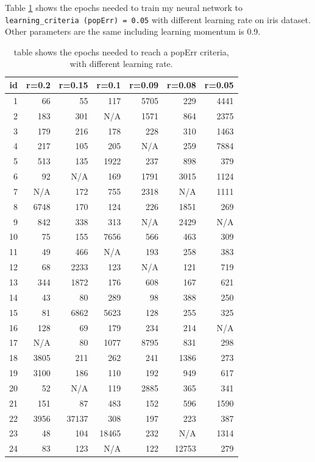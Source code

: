\documentclass[11pt]{article}
\begin{document}
Table \ref{table-epochs-needed} shows the epochs needed to train my neural network to \texttt{learning\_criteria (popErr) = 0.05} with different learning rate on iris dataset. Other parameters are the same including learning momentum is 0.9.

\begin{table}[htb]
\caption{table shows the epochs needed to reach a popErr criteria, with different learning rate.  \label{table-epochs-needed}}
\centering
\begin{tabular}{rrrrrrr}
id & r=0.2 & r=0.15 & r=0.1 & r=0.09 & r=0.08 & r=0.05\\
\hline
1 & 66 & 55 & 117 & 5705 & 229 & 4441\\
2 & 183 & 301 & N/A & 1571 & 864 & 2375\\
3 & 179 & 216 & 178 & 228 & 310 & 1463\\
4 & 217 & 105 & 205 & N/A & 259 & 7884\\
5 & 513 & 135 & 1922 & 237 & 898 & 379\\
6 & 92 & N/A & 169 & 1791 & 3015 & 1124\\
7 & N/A & 172 & 755 & 2318 & N/A & 1111\\
8 & 6748 & 170 & 124 & 226 & 1851 & 269\\
9 & 842 & 338 & 313 & N/A & 2429 & N/A\\
10 & 75 & 155 & 7656 & 566 & 463 & 309\\
11 & 49 & 466 & N/A & 193 & 258 & 383\\
12 & 68 & 2233 & 123 & N/A & 121 & 719\\
13 & 344 & 1872 & 176 & 608 & 167 & 621\\
14 & 43 & 80 & 289 & 98 & 388 & 250\\
15 & 81 & 6862 & 5623 & 128 & 255 & 325\\
16 & 128 & 69 & 179 & 234 & 214 & N/A\\
17 & N/A & 80 & 1077 & 8795 & 831 & 298\\
18 & 3805 & 211 & 262 & 241 & 1386 & 273\\
19 & 3100 & 186 & 110 & 192 & 949 & 617\\
20 & 52 & N/A & 119 & 2885 & 365 & 341\\
21 & 151 & 87 & 483 & 152 & 596 & 1590\\
22 & 3956 & 37137 & 308 & 197 & 223 & 387\\
23 & 48 & 104 & 18465 & 232 & N/A & 1314\\
24 & 83 & 123 & N/A & 122 & 12753 & 279\\

\end{tabular}
\end{table}
\end{document}
